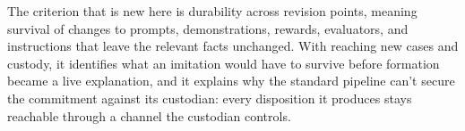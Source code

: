 
The criterion that is new here is durability across revision points, meaning survival of changes to prompts, demonstrations, rewards, evaluators, and instructions that leave the relevant facts unchanged. With reaching new cases and custody, it identifies what an imitation would have to survive before formation became a live explanation, and it explains why the standard pipeline can't secure the commitment against its custodian: every disposition it produces stays reachable through a channel the custodian controls.
